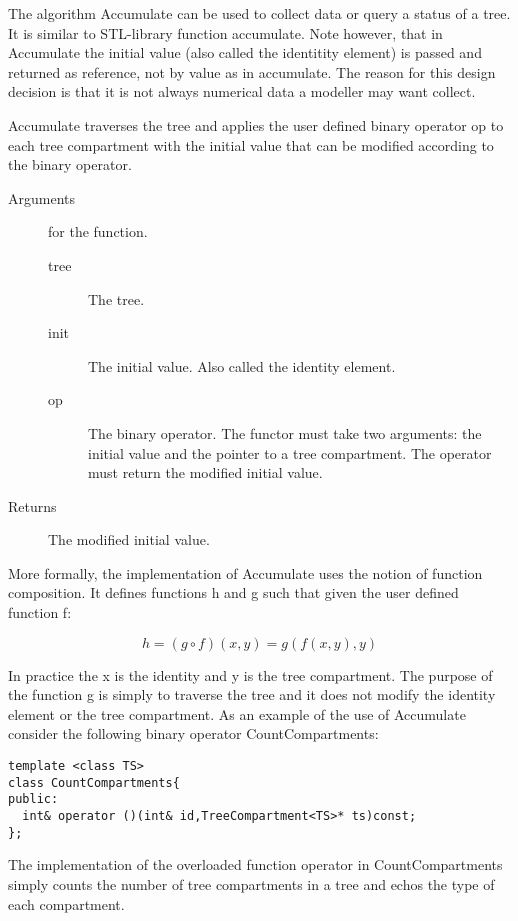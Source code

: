 The algorithm Accumulate can be used to collect data or query a status
of a tree. It  is  similar to STL-library  function  accumulate.  Note
however,  that  in  Accumulate  the  initial  value (also  called  the
identitity element) is passed and returned  as reference, not by value
as in accumulate.  The  reason for this design  decision is that it is
not always numerical data a modeller may want collect.

Accumulate traverses  the tree  and  applies the user  defined  binary
operator op to each  tree compartment with the  initial value that can
be modified according to the binary operator.

\begin{description}
   \item [Arguments] for the function.
     \begin{description}
        \item [tree] The tree.
        \item [init] The initial value. Also called the identity
     element.
        \item [op] The binary operator. The functor must take two
     arguments: the initial value and the pointer to a tree compartment. The
     operator must return the modified initial value.
     \end{description} 
   \item[Returns] The  modified initial value.
\end{description} 

More formally, the implementation of Accumulate uses the notion of
function composition. It defines functions h and g such that given the
user defined function f:

\begin{displaymath}
h = (g \circ f)(x,y) =  g(f(x,y),y)
\end{displaymath}

In practice the x is the  identity and y  is the tree compartment. The
purpose of the function g  is simply to  traverse the tree and it does
not modify the identity element or the tree compartment. As an example
of   the use  of  Accumulate  consider  the  following binary operator
CountCompartments:

\begin{verbatim}
template <class TS>
class CountCompartments{
public:
  int& operator ()(int& id,TreeCompartment<TS>* ts)const;
};
\end{verbatim}

The  implementation   of   the  overloaded   function     operator  in
CountCompartments simply  counts the number of  tree compartments in a
tree and echos the type of each compartment.

